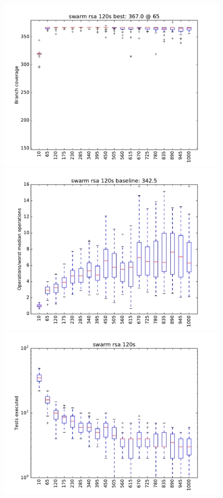 \begin{figure}
\includegraphics[width=\columnwidth]{graphs/rsaswarm120}
\includegraphics[width=\columnwidth]{graphs/opsrsaswarm120}
\includegraphics[width=\columnwidth]{graphs/execrsaswarm120}
\end{figure}



